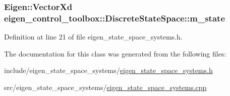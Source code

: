 \subsubsection[{\texorpdfstring{m\+\_\+state}{m_state}}]{\setlength{\rightskip}{0pt plus 5cm}Eigen\+::\+Vector\+Xd eigen\+\_\+control\+\_\+toolbox\+::\+Discrete\+State\+Space\+::m\+\_\+state\hspace{0.3cm}{\ttfamily [protected]}}\hypertarget{classeigen__control__toolbox_1_1_discrete_state_space_afd14e426784cd7a76ee6e5258e3602b0}{}\label{classeigen__control__toolbox_1_1_discrete_state_space_afd14e426784cd7a76ee6e5258e3602b0}


Definition at line 21 of file eigen\+\_\+state\+\_\+space\+\_\+systems.\+h.



The documentation for this class was generated from the following files\+:\begin{DoxyCompactItemize}
\item 
include/eigen\+\_\+state\+\_\+space\+\_\+systems/\hyperlink{eigen__state__space__systems_8h}{eigen\+\_\+state\+\_\+space\+\_\+systems.\+h}\item 
src/eigen\+\_\+state\+\_\+space\+\_\+systems/\hyperlink{eigen__state__space__systems_8cpp}{eigen\+\_\+state\+\_\+space\+\_\+systems.\+cpp}\end{DoxyCompactItemize}

